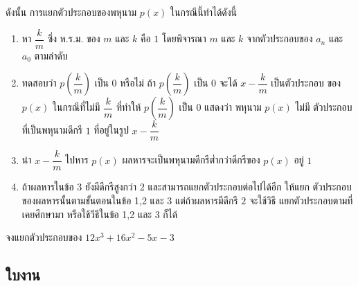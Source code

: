  
 \newpage
ดังนั้น การแยกตัวประกอบของพหุนาม $p(x)$ ในกรณีนี้ทำได้ดังนี้

\begin{conceptbox}
	\begin{enumerate}
		\item หา $\dfrac{k}{m}$ ซึ่ง ห.ร.ม. ของ $m$ และ $k$ คือ $1$ โดยพิจารณา $m$ และ $k$ จากตัวประกอบของ $a_n$ และ $a_0$ ตามลำดับ
		\item ทดสอบว่า $p\left(\dfrac{k}{m}\right)$ เป็น $0$ หรือไม่ ถ้า $p\left(\dfrac{k}{m}\right)$ เป็น $0$ จะได้ $x-\dfrac{k}{m}$ เป็นตัวประกอบ ของ $p(x)$ ในกรณีที่ไม่มี $\dfrac{k}{m}$ ที่ทำให้ $p\left(\dfrac{k}{m}\right)$ เป็น $0$ แสดงว่า พหุนาม $p(x)$ ไม่มี ตัวประกอบที่เป็นพหุนามดีกรี $1$ ที่อยู่ในรูป $x-\dfrac{k}{m}$
		\item นำ $x-\dfrac{k}{m}$ ไปหาร $p(x)$ ผลหารจะเป็นพหุนามดีกรีต่ำกว่าดีกรีของ $p(x)$ อยู่ $1$
		\item ถ้าผลหารในข้อ 3 ยังมีดีกรีสูงกว่า $2$ และสามารถแยกตัวประกอบต่อไปได้อีก ให้แยก ตัวประกอบของผลหารนั้นตามขั้นตอนในข้อ 1,2 และ 3 แต่ถ้าผลหารมีดีกรี $2$ จะใช้วิธี แยกตัวประกอบตามที่เคยศึกษามา หรือใช้วีธีในข้อ 1,2 และ 3 ก็ได้
	\end{enumerate}
\end{conceptbox}
 
 \newpage
  \begin{examplebox}
 	จงแยกตัวประกอบของ $12x^3+16x^2-5x-3$
 \end{examplebox}
 \solution 
  \newpage
  
\subsection*{ใบงาน}

